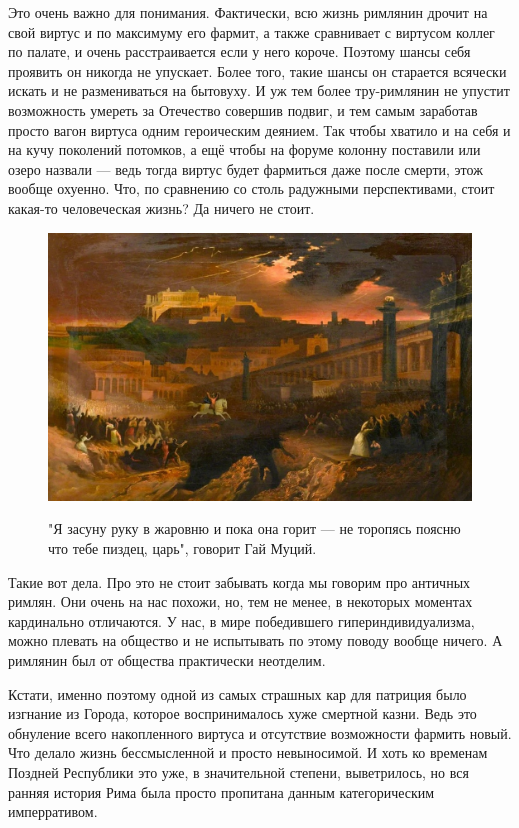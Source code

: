 Это очень важно для понимания. Фактически, всю жизнь римлянин дрочит на свой виртус и по максимуму его фармит, а также сравнивает с виртусом коллег по палате, и очень расстраивается если у него короче. Поэтому шансы себя проявить он никогда не упускает. Более того, такие шансы он старается всячески искать и не размениваться на бытовуху. И уж тем более тру-римлянин не упустит возможность умереть за Отечество совершив подвиг, и тем самым заработав просто вагон виртуса одним героическим деянием. Так чтобы хватило и на себя и на кучу поколений потомков, а ещё чтобы на форуме колонну поставили или озеро назвали — ведь тогда виртус будет фармиться даже после смерти, этож вообще охуенно. Что, по сравнению со столь радужными перспективами, стоит какая-то человеческая жизнь? Да ничего не стоит.
\begin{figure}[h!tb]
	\centering\includegraphics[scale=0.4]{Two_coolstories/1602147873151469527.png}
	\label{fig:coolst2} %
	\caption{"Я засуну руку в жаровню и пока она горит — не торопясь поясню что тебе пиздец, царь", говорит Гай Муций.	}
\end{figure}

Такие вот дела. Про это не стоит забывать когда мы говорим про античных римлян. Они очень на нас похожи, но, тем не менее, в некоторых моментах кардинально отличаются. У нас, в мире победившего гипериндивидуализма, можно плевать на общество и не испытывать по этому поводу вообще ничего. А римлянин был от общества практически неотделим.


Кстати, именно поэтому одной из самых страшных кар для патриция было изгнание из Города, которое воспринималось хуже смертной казни. Ведь это обнуление всего накопленного виртуса и отсутствие возможности фармить новый. Что делало жизнь бессмысленной и просто невыносимой. И хоть ко временам Поздней Республики это уже, в значительной степени, выветрилось, но вся ранняя история Рима была просто пропитана данным категорическим имперративом.


